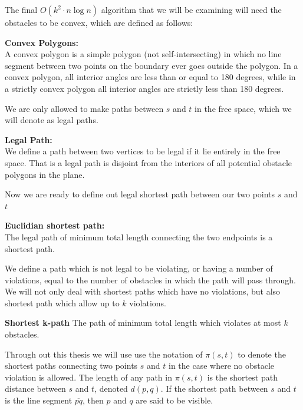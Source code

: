 The final $O(k^2 \cdot n \log n)$ algorithm that we will be examining will  
need the obstacles to be convex, which are defined as follows: 

\begin{mydef}
	\textbf{Convex Polygons:} \\ 
	A convex polygon is a simple polygon (not self-intersecting) in which no
	line segment between two points on the boundary ever goes outside the
	polygon. In a convex polygon, all interior angles are less than or equal to
	180 degrees, while in a strictly convex polygon all interior angles are
	strictly less than 180 degrees.
	\cite{Bisector-collinearity-convexPoly} 
\end{mydef}

We are only allowed to make paths between $s$ and $t$ in the free space, which we 
will denote as legal paths.

\begin{mydef}
	\textbf{Legal Path:}\\ 
	We define a path between two vertices to be
	legal if it lie entirely in the free space. That is a legal path is disjoint
	from the interiors of all potential obstacle polygons in the plane.
\end{mydef}

Now we are ready to define out legal shortest path between our two points $s$ and 
$t$

\begin{mydef}
	\textbf{Euclidian shortest path:}\\ 
	The legal path of minimum total length connecting the two endpoints is a 
    shortest path.  
\end{mydef}

We define a path which is not legal to be violating, or having a number of
violations, equal to the number of obstacles in which the path will pass
through. We will not only deal with shortest paths which have no violations,
but also shortest path which allow up to $k$ violations.

\begin{mydef}
	\textbf{Shortest k-path}
	The path of minimum total length which violates at most $k$ obstacles.
\end{mydef}

Through out this thesis we will use use the notation of $\pi(s,t)$ to denote the 
shortest paths connecting two points $s$ and $t$ in the case where no obstacle 
violation is allowed. The length of any path in	$\pi(s,t)$ is the shortest path 
distance between $s$ and $t$, denoted $d(p,q)$. If the shortest path between $s$ 
and $t$ is the line segment $\overline{pq}$, then $p$ and $q$ are said to be 
visible. 

